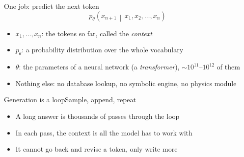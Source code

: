 \begin{frame}{One job: predict the next token}
  \begin{equation*}
    p_\theta\left(x_{n+1} \,\middle|\, x_1, x_2, \ldots, x_n\right)
  \end{equation*}

  \begin{itemize}
    \item $x_1, \ldots, x_n$: the tokens so far, called the \emph{context}
    \item $p_\theta$: a probability distribution over the whole vocabulary
    \item<2-> $\theta$: the parameters of a neural network (a \emph{transformer}),
          $\sim 10^{11}$--$10^{12}$ of them
    \item<3-> Nothing else: no database lookup, no symbolic engine, no physics module
  \end{itemize}
\end{frame}

\begin{frame}{Generation is a loop}{Sample, append, repeat}
  \vspace{1ex}
  \begin{center}
  \end{center}
  \vspace{1ex}

  \begin{itemize}
    \item<2-> A long answer is thousands of passes through the loop
    \item<3-> In each pass, the context is all the model has to work with
    \item<4-> It cannot go back and revise a token, only write more
  \end{itemize}
\end{frame}

